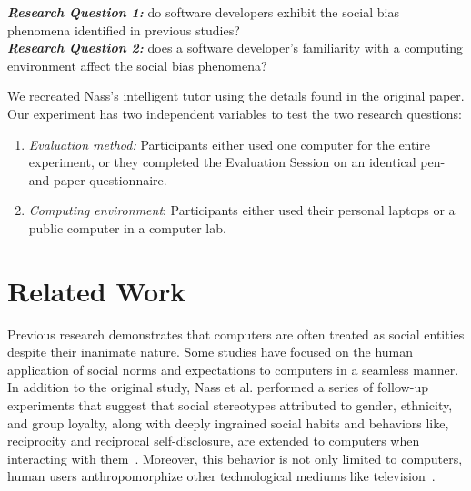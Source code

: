\documentclass{sig-alternate-05-2015}
\begin{document}
\noindent \textbf{\emph{Research Question 1:}} do software developers exhibit the social bias phenomena identified in previous studies?\\

\noindent \textbf{\emph{Research Question 2:}} does a software developer's familiarity with a computing environment affect the social bias phenomena?\\

We recreated Nass's intelligent tutor using the details found in the original paper. Our experiment has two independent variables to test the two research questions:
\begin{enumerate}
    \item{\emph{Evaluation method:} Participants either used one computer for the entire experiment, or they completed the Evaluation Session on an identical pen-and-paper questionnaire.}
    \item {\textit{Computing environment}: Participants either used their personal laptops or a public computer in a computer lab.}
\end{enumerate}

\section{Related Work}
Previous research demonstrates that computers are often treated as social entities despite their inanimate nature. Some studies have focused on the human application of social norms and expectations to computers in a seamless manner. In addition to the original study, Nass et al. performed a series of follow-up experiments that suggest that social stereotypes attributed to gender, ethnicity, and group loyalty, along with deeply ingrained social habits and behaviors like, reciprocity and reciprocal self-disclosure, are extended to computers when interacting with them~\cite{Nass2000machines,nass1999people}. Moreover, this behavior is not only limited to computers, human users anthropomorphize other technological mediums like television~\cite{reeves1996people}.
\end{document}
